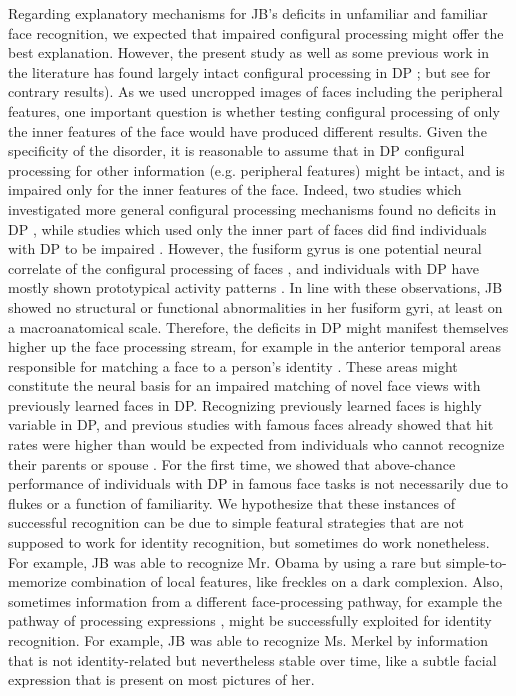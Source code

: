 \documentclass[fleqn,10pt]{SelfArx} %
\begin{document}
Regarding explanatory mechanisms for JB's deficits in unfamiliar and familiar face recognition, we expected that impaired configural processing might offer the best explanation. However, the present study as well as some previous work in the literature has found largely intact configural processing in DP \citep{Duchaine_2000, Le_Grand_2006}; but see \citet{Behrmann_2005} for contrary results). As we used uncropped images of faces including the peripheral features, one important question is whether testing configural processing of only the inner features of the face would have produced different results. Given the specificity of the disorder, it is reasonable to assume that in DP configural processing for other information (e.g. peripheral features) might be intact, and is impaired only for the inner features of the face. Indeed, two studies which investigated more general configural processing mechanisms found no deficits in DP \citep{Duchaine_2000, Le_Grand_2006}, while studies which used only the inner part of faces did find individuals with DP to be impaired \citep{Avidan_2011, Palermo_2011}. However, the fusiform gyrus is one potential neural correlate of the configural processing of faces \citep{Schiltz_2006}, and individuals with DP have mostly shown prototypical activity patterns \citep{Hasson_2003, Avidan_2005, Furl_2011}. In line with these observations, JB showed no structural or functional abnormalities in her fusiform gyri, at least on a macroanatomical scale. Therefore, the deficits in DP might manifest themselves higher up the face processing stream, for example in the anterior temporal areas responsible for matching a face to a person's identity \citep{Kriegeskorte_2007, Landi_2017}. These areas might constitute the neural basis for an impaired matching of novel face views with previously learned faces \citep{Duchaine_2000} in DP. Recognizing previously learned faces is highly variable in DP, and previous studies with famous faces already showed that hit rates were higher than would be expected from individuals who cannot recognize their parents or spouse \citep{Rivolta_2012, Garrido_2009}. For the first time, we showed that above-chance performance of individuals with DP in famous face tasks is not necessarily due to flukes or a function of familiarity. We hypothesize that these instances of successful recognition can be due to simple featural strategies that are not supposed to work for identity recognition, but sometimes do work nonetheless. For example, JB was able to recognize Mr. Obama by using a rare but simple-to-memorize combination of local features, like freckles on a dark complexion. Also, sometimes information from a different face-processing pathway, for example the pathway of processing expressions \citep{Haxby_2000, Calder_2005}, might be successfully exploited for identity recognition. For example, JB was able to recognize Ms. Merkel by information that is not identity-related but nevertheless stable over time, like a subtle facial expression that is present on most pictures of her.
\end{document}

